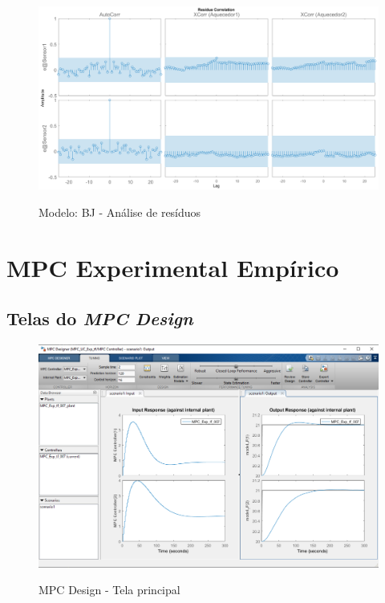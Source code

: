 \begin{apendicesenv}
\begin{figure}
	\caption{Modelo: BJ - Análise de resíduos}
	\begin{center}
		\includegraphics[width=1.00\textwidth]{./5_images/tclabsp-models-BJ-resid.png} 
		\label{fig:tclabsp-models-bj-resid}
	\end{center}
	\centering
\end{figure}

\chapter{MPC Experimental Empírico}
\label{ch:mpc_experimental_empirico}

\section{Telas do \textit{MPC Design}}

\begin{figure}[!h]
	\caption{MPC Design - Tela principal}
	\begin{center}
		\includegraphics[width=1.00\textwidth]{./5_images/mpcdesign_main.png} 
		\label{fig:mpcdesign_main}
	\end{center}
	\centering
\end{figure}


\end{apendicesenv}
